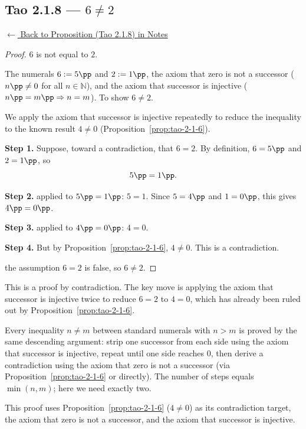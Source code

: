 
\subsection*{Tao 2.1.8 --- $6 \neq 2$}
\label{prf:tao-2-1-8}

\begin{remark*}[Return]
\hyperref[prop:tao-2-1-8]{$\leftarrow$ Back to Proposition (Tao 2.1.8) in Notes}
\end{remark*}

\begin{proof}
\Claim $6$ is not equal to $2$.

\Given The numerals $6 := 5\pp$ and $2 := 1\pp$, the axiom that zero is not a
successor ($n\pp \neq 0$ for all $n \in \mathbb{N}$), and the axiom that
successor is injective ($n\pp = m\pp \Rightarrow n = m$).
\Goal To show $6 \neq 2$.

\Strategy We apply the axiom that successor is injective repeatedly to reduce
the inequality to the known result $4 \neq 0$
(Proposition~\ref{prop:tao-2-1-6}).

\textbf{Step 1.}
Suppose, toward a contradiction, that $6 = 2$.
By definition, $6 = 5\pp$ and $2 = 1\pp$, so
\[
    5\pp = 1\pp.
\]

\textbf{Step 2.}
 applied to $5\pp = 1\pp$: $5 = 1$.
Since $5 = 4\pp$ and $1 = 0\pp$, this gives $4\pp = 0\pp$.

\textbf{Step 3.}
 applied to $4\pp = 0\pp$: $4 = 0$.

\textbf{Step 4.}
But by Proposition~\ref{prop:tao-2-1-6}, $4 \neq 0$.
This is a contradiction.

\Hence the assumption $6 = 2$ is false, so $6 \neq 2$. \AsReq
\end{proof}

\begin{remark*}
This is a proof by contradiction. The key move is applying the axiom that
successor is injective twice to reduce $6 = 2$ to $4 = 0$, which has already
been ruled out by Proposition~\ref{prop:tao-2-1-6}.
\end{remark*}

\begin{remark*}
Every inequality $n \neq m$ between standard numerals with $n > m$ is proved by the
same descending argument: strip one successor from each side using the axiom that
successor is injective, repeat until one side reaches $0$, then derive a
contradiction using the axiom that zero is not a successor (via
Proposition~\ref{prop:tao-2-1-6} or directly). The number of steps equals
$\min(n, m)$; here we need exactly two.
\end{remark*}

\begin{remark*}[Dependencies]
This proof uses Proposition~\ref{prop:tao-2-1-6} ($4 \neq 0$) as its
contradiction target, the axiom that zero is not a successor, and the axiom
that successor is injective.
\end{remark*}
